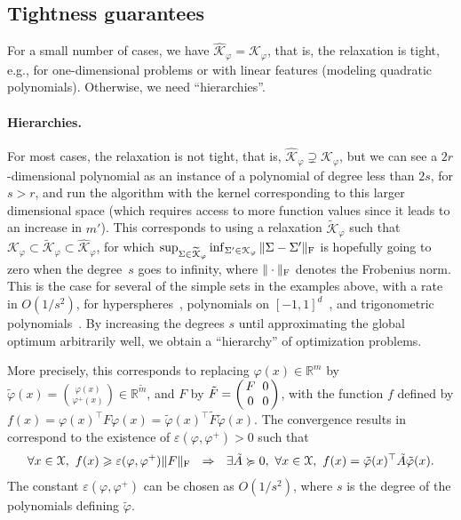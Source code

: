 \documentclass[11pt]{article}
\makeatletter
\newcommand{\rb}{\mathbb{R}}
\def \X{{\mathcal X}}
\def \K{{\mathcal K}}
\newcommand{\bimat}[4]{\bigg(  \! \! \begin{array}{c@{\hspace{2mm}}c} {#1} &  {#2} \\ {#3} &  {#4} \end{array}   \! \! \bigg)}
\makeatother
\begin{document}
  \subsection{Tightness guarantees}
\label{sec:sosguarantees}
For a small number of cases, we have $\widehat{\K}_\varphi = \K_\varphi$, that is, the relaxation is tight, e.g., for one-dimensional problems or with linear features (modeling quadratic polynomials). Otherwise, we need ``hierarchies''.


\paragraph{Hierarchies.}
For most cases, the relaxation is not tight, that is, $\widehat{\K}_\varphi \supsetneq \K_\varphi$, but we can see a $2r$-dimensional polynomial as an instance of a polynomial of degree less than $2s$, for $s>r$, and run the algorithm with the kernel corresponding to this larger dimensional space (which requires access to more function values since it leads to an increase in $m'$). This corresponds to using a relaxation $\widetilde{\K}_\varphi$ such that $ {\K}_\varphi  \subset  \widetilde{\K}_\varphi  \subset  \widehat{\K}_\varphi$, for which $\sup_{\Sigma \in \widetilde{\K}_\varphi} \inf_{ \Sigma' \in {\K}_\varphi} \| \Sigma - \Sigma' \|_{\rm F}$ is hopefully going to zero when the degree~$s$ goes to infinity, where $\| \cdot \|_{\rm F}$ denotes the Frobenius norm. This is the case for several of the simple sets in the examples above, with a rate in $O(1/s^2)$, for hyperspheres~\cite{fang2021sum}, polynomials on $[-1,1]^d$~\cite{laurent2022effective}, and trigonometric polynomials~\cite{bach2022exponential}. By increasing the degrees $s$ until approximating the global optimum arbitrarily well, we obtain a ``hierarchy'' of optimization problems.

More precisely, this corresponds to replacing $\varphi(x) \in \rb^m$ by $\tilde{\varphi}(x) = { \varphi(x) \choose \varphi^+(x) } \in \rb^{ \tilde{m}}$, and $F$ by $\tilde{F} = \bimat{F}{0}{0}{0}$, with the function $f$ defined by $f(x) = \varphi(x)^\top F \varphi(x) = \tilde{\varphi}(x)^\top \tilde{F} \tilde{\varphi}(x)$. The convergence results in~\cite{fang2021sum,laurent2022effective,bach2022exponential} correspond to the existence of $\varepsilon(\varphi,\varphi^+) >0$ such that
\[
\forall x \in \X, \ f(x) \geqslant \varepsilon(\varphi,\varphi^+) \| F\|_{\rm F} \ \ \Rightarrow \ \ \exists \tilde{A} \succcurlyeq 0, \ \forall x \in \X, \ f(x) = \tilde{\varphi}(x)^\top \tilde{A} \tilde{\varphi}(x).
\]
The constant $\varepsilon(\varphi,\varphi^+)$ can be chosen as $O(1/s^2)$, where $s$ is the degree of the polynomials defining $\tilde{\varphi}$.
\end{document}
